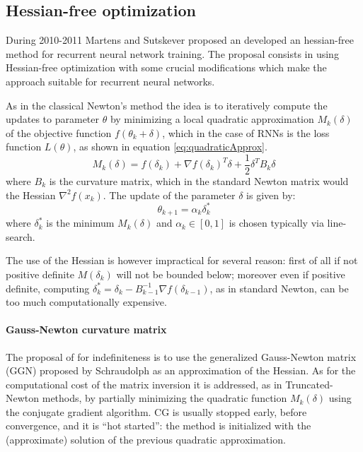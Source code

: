 \subsection{Hessian-free optimization}

During 2010-2011 Martens and Sutskever\cite{hessianFree} proposed an developed an hessian-free method for recurrent neural network training.
The proposal consists in using Hessian-free optimization with some crucial modifications which make the approach suitable for recurrent neural networks.

As in  the classical Newton's method the idea is to iteratively compute the updates to parameter $\theta$ by minimizing a local quadratic approximation $M_{k}(\delta)$ of the objective function $f(\theta_k +\delta)$, which in the case of RNNs is the loss function $L(\theta)$, as shown in equation \ref{eq:quadraticApprox}.
\begin{equation}
 M_{k}(\delta) = f(\delta_{k})+\nabla f(\delta_{k})^T \delta +\frac{1}{2}\delta^T B_{k}\delta
 \label{eq:quadraticApprox}
\end{equation}
where $B_k$ is the curvature matrix, which in the standard Newton matrix would the Hessian $\nabla^2f(x_k)$.
The update of the parameter $\delta$ is given by:
\begin{equation}
 \theta_{k+1} = \alpha_k\delta_k^* 
\end{equation}
where $\delta_k^*$ is the minimum $M_k(\delta)$ and $\alpha_k\in[0,1]$ is chosen typically via line-search. 

The use of the Hessian is however impractical for several reason: first of all if not positive definite $M(\delta_k)$ will not be bounded below; moreover even if positive definite, computing $\delta_k^* = \delta_k - B_{k-1}^{-1}\nabla f(\delta_{k-1})$, as in standard Newton, can be too much computationally expensive.

\paragraph{Gauss-Newton curvature matrix}
The proposal of \cite{hessianFree} for indefiniteness is to use the generalized Gauss-Newton matrix (GGN) proposed by Schraudolph\cite{gaussNewtonMatrix} as an approximation of the Hessian. As for the computational cost of the matrix inversion it is addressed, as in Truncated-Newton methods, by partially minimizing the quadratic function $M_{k}(\delta)$ using the conjugate gradient algorithm. CG is usually stopped early, before convergence, and it is ``hot started'': the method is initialized with the (approximate) solution of the previous quadratic approximation.

